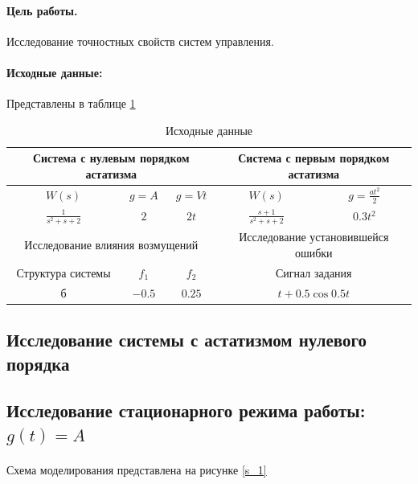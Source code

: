 \documentclass[a4paper,12pt]{article}
\begin{document}
	
	\paragraph{Цель работы.} Исследование точностных свойств систем управления.
	
	\paragraph {Исходные данные:} Представлены в таблице \ref{t_1}
	
	\begin{table}[h]
		\centering
		\caption{Исходные данные}
		\renewcommand{\arraystretch}{2} 
		\renewcommand{\tabcolsep}{0.55cm}
		\begin{center}
			\begin{tabular}{|c|c|c|c|c|}
				\hline
				\multicolumn{3}{|c|}{Система с нулевым порядком астатизма} & \multicolumn{2}{|c|}{Система с первым порядком астатизма} \\ \hline
				$W(s)$ & $g=A$ & $g=Vt$ & $W(s)$ & $g=\frac{at^2}{2}$ \\ \hline
				$\frac{1}{s^2+s+2}$ & $2$ & $2t$ & $\frac{s+1}{s^2+s+2}$ & $0.3t^2$ \\ \hline
				\multicolumn{3}{|c|}{Исследование влияния возмущений} & \multicolumn{2}{c|}{Исследование установившейся ошибки} \\ \hline
				Структура системы & $f_1$ & $f_2$ & \multicolumn{2}{c|}{Сигнал задания} \\ \hline
				б & $-0.5$ & $0.25$ & \multicolumn{2}{c|}{$t+0.5\cos0.5t$} \\ \hline
			\end{tabular}
		\end{center}
		\label{t_1}
	\end{table}
	\newpage
	\begin{center}
		\section{Исследование системы с астатизмом нулевого порядка}
	\end{center}
	\subsection{Исследование стационарного режима работы: $g(t)=A$}
	
	\paragraph {} Схема моделирования представлена на рисунке \ref{s_1}
	
\end{document}
